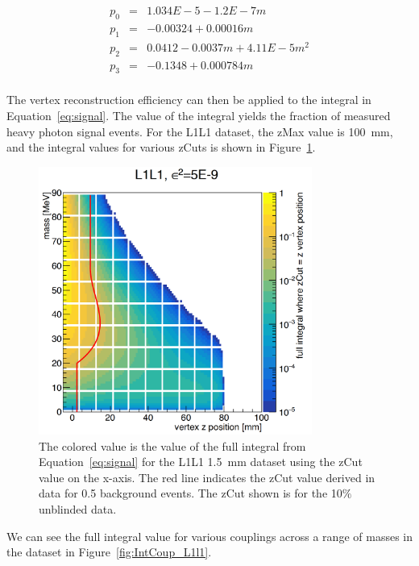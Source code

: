 \begin{eqnarray*}
\label{eq:parsEpsVtxL1_1p5}
p_0 & = & 1.034E-5-1.2E-7m \\
p_1 & = & -0.00324+0.00016m \\
p_2 & = & 0.0412-0.0037m+4.11E-5m^2 \\
p_3 & = & -0.1348+0.000784m \\
\end{eqnarray*}

The vertex reconstruction efficiency can then be applied to the integral in Equation~\eqref{eq:signal}. The value of the integral yields the fraction of measured heavy photon signal events. For the L1L1 dataset, the zMax value is 100~mm, and the integral values for various zCuts is shown in Figure~\ref{fig:Inteff_L1L1_1p5}.

\begin{figure}[H]
  \centering
     \includegraphics[width=0.8\textwidth]{plots/L1L1_eff1p5_zm.png}
  \caption{The colored value is the value of the full integral from Equation~\ref{eq:signal} for the L1L1 1.5~mm dataset using the zCut value on the x-axis. The red line indicates the zCut value derived in data for 0.5 background events. The zCut shown is for the 10$\%$ unblinded data.}
  \label{fig:Inteff_L1L1_1p5}
\end{figure} 

 We can see the full integral value for various couplings across a range of masses in the dataset in Figure~\ref{fig:IntCoup_L1l1}.

